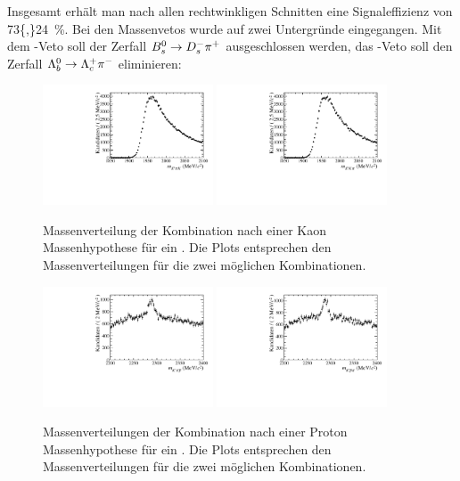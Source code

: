 Insgesamt erhält man nach allen rechtwinkligen Schnitten eine Signaleffizienz von \SI{73{,}24}{\%}. Bei den Massenvetos wurde auf zwei Untergründe eingegangen. Mit dem \Dsm-Veto soll der Zerfall ${{B}^0_{s}}\rightarrow{\ensuremath{{D}^-_{s}}}{\ensuremath{{\pi}^+}}$ ausgeschlossen werden, das \Lc-Veto soll den Zerfall ${{\Lambda}^0_{b}}\rightarrow{\ensuremath{{\Lambda}^+_{c}}}{\ensuremath{{\pi}^-}}$ eliminieren:
\begin{figure}[tbp]
	\centering
		\includegraphics[width=0.45\textwidth]{fig/obsMass_Ds1.pdf}
		\includegraphics[width=0.45\textwidth]{fig/obsMass_Ds2.pdf}
	\caption{Massenverteilung der \Kp\pim\pim Kombination nach einer Kaon Massenhypothese für ein \pim. Die Plots entsprechen den Massenverteilungen für die zwei möglichen Kombinationen.}
	\label{fig:dsveto} 
\end{figure} 
\begin{figure}[tbp]
	\centering
		\includegraphics[width=0.45\textwidth]{fig/obsMass_lambda1.pdf}
		\includegraphics[width=0.45\textwidth]{fig/obsMass_lambda2.pdf}
	\caption{Massenverteilungen der \Kp\pim\pim Kombination nach einer Proton Massenhypothese für ein \pim. Die Plots entsprechen den Massenverteilungen für die zwei möglichen Kombinationen.}
	\label{fig:lcveto} 
\end{figure}  
